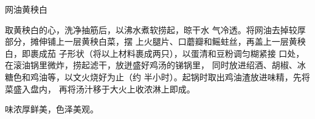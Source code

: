 \begin{recipe}{网油黄秧白}

\ingredients






\cooking

取黄秧白的心，洗净抽筋后，以沸水煮软捞起，晾干水 气冷透。将网油去掉较厚部分，摊伸铺上一层黄秧白菜，摆 上火腿片、口蘑瓣和鳐蛀丝，再盖上一层黄秧白，即裹成茄 子形状（将以上材料裹成两只），以蛋清和豆粉调匀糊紧接 口处，在滚油锅里微炸，捞起滤干，放迸盛好鸡汤的锑锅里， 同时放进绍酒、胡椒、冰糖色和鸡油等，以文火烧好为止（约 半小时）。起锅时取出鸡油渣放进味精，先将菜盛入盘内， 再将汤汁移于大火上收浓淋上即成。

\notes

味浓厚鲜美，色泽美观。

\end{recipe}

